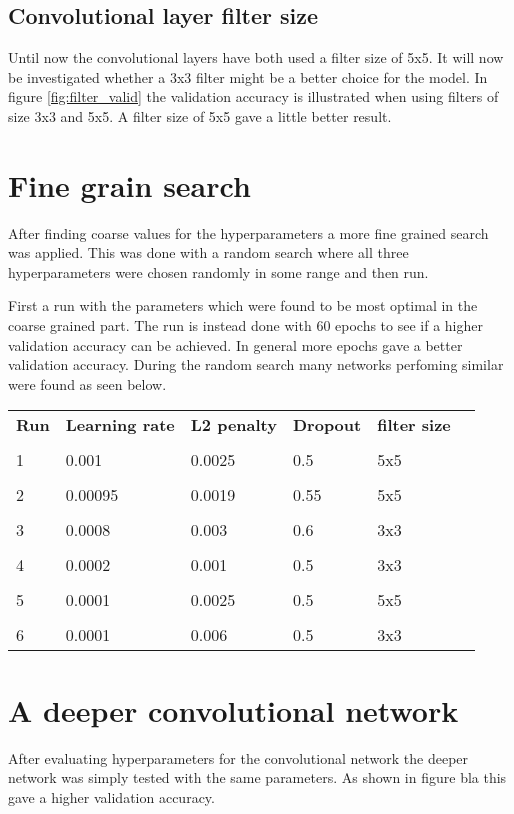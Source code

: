 
\FloatBarrier
\subsection{Convolutional layer filter size}
Until now the convolutional layers have both used a filter size of 5x5. It will now be investigated whether a 3x3 filter might be a better choice for the model. In figure \ref{fig:filter_valid} the validation accuracy is illustrated when using filters of size 3x3 and 5x5. A filter size of 5x5 gave a little better result.



\section{Fine grain search}
After finding coarse values for the hyperparameters a more fine grained search was applied. This was done with a random search where all three hyperparameters were chosen randomly in some range and then run.

First a run with the parameters which were found to be most optimal in the coarse grained part. The run is instead done with 60 epochs to see if a higher validation accuracy can be achieved. In general more epochs gave a better validation accuracy. During the random search many networks perfoming similar were found as seen below. 

\begin{center}
	\begin{tabular}{l  l l l l l }
	\textbf{Run} &  \textbf{Learning rate} & \textbf{L2 penalty} &  	\textbf{Dropout} & \textbf{filter size} & \\
		\\
		1 & 0.001 & 0.0025 & 0.5 & 5x5 \\\hline
		\\
		2 & 0.00095 & 0.0019 & 0.55 & 5x5 \\\hline
		\\
		3 & 0.0008 & 0.003 & 0.6 & 3x3 \\\hline
		\\
		4 & 0.0002 & 0.001 & 0.5 & 3x3 \\\hline
		\\
		5 & 0.0001 & 0.0025 & 0.5 & 5x5 \\\hline
		\\
		6 & 0.0001 & 0.006 & 0.5 & 3x3 \\\hline
	\end{tabular}
\end{center}

\section{A deeper convolutional network}
After evaluating hyperparameters for the convolutional network the deeper network was simply tested with the same parameters. As shown in figure bla   this gave a higher validation accuracy.



